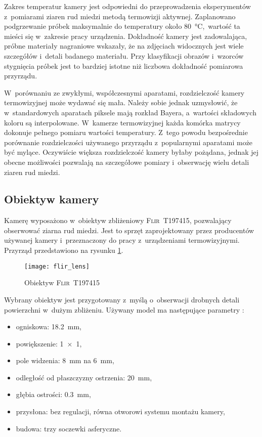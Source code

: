 Zakres temperatur kamery jest odpowiedni do przeprowadzenia eksperymentów
z~pomiarami ziaren rud miedzi metodą termowizji aktywnej.
Zaplanowano podgrzewanie próbek maksymalnie do temperatury około
\SI{80}{\celsius},~wartość ta mieści się w~zakresie pracy urządzenia.
Dokładność kamery jest zadowalająca, próbne materiały nagraniowe wskazały, że na
zdjęciach widocznych jest wiele szczegółów i~detali badanego materiału.
Przy klasyfikacji obrazów i~wzorców stygnięcia próbek jest to bardziej istotne
niż liczbowa dokładność pomiarowa przyrządu.

W~porównaniu ze zwykłymi, współczesnymi aparatami, rozdzielczość kamery
termowizyjnej może wydawać się mała.
Należy sobie jednak uzmysłowić, że w~standardowych aparatach piksele mają
rozkład Bayera, a~wartości składowych koloru są interpolowane.
W~kamerze termowizyjnej każda komórka matrycy dokonuje pełnego pomiaru wartości
temperatury.
Z~tego powodu bezpośrednie porównanie rozdzielczości używanego przyrządu
z~popularnymi aparatami może być mylące.
Oczywiście większa rozdzielczość kamery byłaby pożądana, jednak jej obecne
możliwości pozwalają na szczegółowe pomiary i~obserwację wielu detali ziaren
rud miedzi.

\subsection{Obiektyw kamery}
\label{subsec:lens}
Kamerę wyposażono w~obiektyw zbliżeniowy \textsc{Flir~T197415}, pozwalający
obserwować ziarna rud miedzi.
Jest to sprzęt zaprojektowany przez producentów używanej kamery i~przeznaczony
do pracy z~urządzeniami termowizyjnymi.
Przyrząd przedstawiono na rysunku \ref{fig:lens}.
\begin{figure}[h]
    \centering
    \texttt{[image: flir\_lens]}
    \caption{Obiektyw \textsc{Flir~T197415} \cite{flir_lens_specs}}
    \label{fig:lens}
\end{figure}
Wybrany obiektyw jest przygotowany z~myślą o~obserwacji drobnych detali
powierzchni w~dużym zbliżeniu.
Używany model ma następujące parametry \cite{flir_lens_specs}:
\begin{itemize}
    \item ogniskowa: \SI{18,2}{\milli\meter},
    \item powiększenie: \num{1x1},
    \item pole widzenia: \SI{8}{\milli\meter} na \SI{6}{\milli\meter},
    \item odległość od płaszczyzny ostrzenia: \SI{20}{\milli\meter},
    \item głębia ostrości: \SI{0,3}{\milli\meter},
    \item przysłona: bez regulacji, równa otworowi systemu montażu kamery,
    \item budowa: trzy soczewki asferyczne.
\end{itemize}

